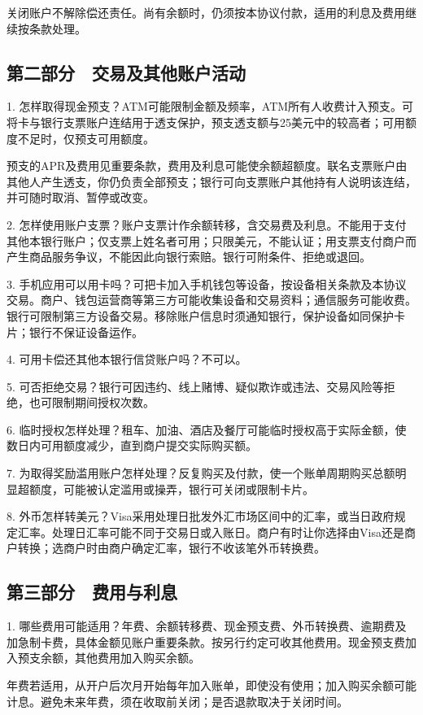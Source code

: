 \documentclass[UTF8,fontset=none,11pt,a4paper]{ctexart}
\begin{document}
关闭账户不解除偿还责任。尚有余额时，仍须按本协议付款，适用的利息及费用继续按条款处理。


\subsection*{第二部分　交易及其他账户活动}
1. 怎样取得现金预支？ATM可能限制金额及频率，ATM所有人收费计入预支。可将卡与银行支票账户连结用于透支保护，预支透支额与25美元中的较高者；可用额度不足时，仅预支可用额度。


预支的APR及费用见重要条款，费用及利息可能使余额超额度。联名支票账户由其他人产生透支，你仍负责全部预支；银行可向支票账户其他持有人说明该连结，并可随时取消、暂停或改变。


2. 怎样使用账户支票？账户支票计作余额转移，含交易费及利息。不能用于支付其他本银行账户；仅支票上姓名者可用；只限美元，不能认证；用支票支付商户而产生商品服务争议，不能因此向银行索赔。银行可附条件、拒绝或退回。


3. 手机应用可以用卡吗？可把卡加入手机钱包等设备，按设备相关条款及本协议交易。商户、钱包运营商等第三方可能收集设备和交易资料；通信服务可能收费。银行可限制第三方设备交易。移除账户信息时须通知银行，保护设备如同保护卡片；银行不保证设备运作。


4. 可用卡偿还其他本银行信贷账户吗？不可以。


5. 可否拒绝交易？银行可因违约、线上赌博、疑似欺诈或违法、交易风险等拒绝，也可限制期间授权次数。


6. 临时授权怎样处理？租车、加油、酒店及餐厅可能临时授权高于实际金额，使数日内可用额度减少，直到商户提交实际购买额。


7. 为取得奖励滥用账户怎样处理？反复购买及付款，使一个账单周期购买总额明显超额度，可能被认定滥用或操弄，银行可关闭或限制卡片。


8. 外币怎样转美元？Visa采用处理日批发外汇市场区间中的汇率，或当日政府规定汇率。处理日汇率可能不同于交易日或入账日。商户有时让你选择由Visa还是商户转换；选商户时由商户确定汇率，银行不收该笔外币转换费。


\subsection*{第三部分　费用与利息}
1. 哪些费用可能适用？年费、余额转移费、现金预支费、外币转换费、逾期费及加急制卡费，具体金额见账户重要条款。按另行约定可收其他费用。现金预支费加入预支余额，其他费用加入购买余额。


年费若适用，从开户后次月开始每年加入账单，即使没有使用；加入购买余额可能计息。避免未来年费，须在收取前关闭；是否退款取决于关闭时间。
\end{document}
